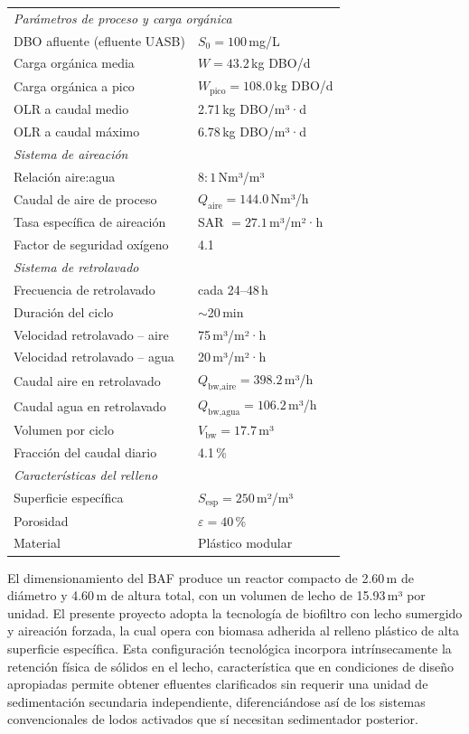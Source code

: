 \begin{longtable}{p{7cm}p{6cm}}
%
\multicolumn{2}{l}{\textit{Parámetros de proceso y carga orgánica}} \\[2pt]
DBO afluente (efluente UASB)  & $S_0 = 100$\,mg/L \\
Carga orgánica media          & $W = 43.2$\,kg DBO/d \\
Carga orgánica a pico         & $W_{\text{pico}} = 108.0$\,kg DBO/d \\
OLR a caudal medio            & 2.71\,kg DBO/m³·d \\
OLR a caudal máximo           & 6.78\,kg DBO/m³·d \\[4pt]
%
\multicolumn{2}{l}{\textit{Sistema de aireación}} \\[2pt]
Relación aire:agua            & $8:1$\,Nm³/m³ \\
Caudal de aire de proceso     & $Q_{\text{aire}} = 144.0$\,Nm³/h \\
Tasa específica de aireación  & SAR $= 27.1$\,m³/m²·h \\
Factor de seguridad oxígeno   & 4.1 \\[4pt]
%
\multicolumn{2}{l}{\textit{Sistema de retrolavado}} \\[2pt]
Frecuencia de retrolavado     & cada 24--48\,h \\
Duración del ciclo            & $\sim$20\,min \\
Velocidad retrolavado -- aire & 75\,m³/m²·h \\
Velocidad retrolavado -- agua & 20\,m³/m²·h \\
Caudal aire en retrolavado    & $Q_{\text{bw,aire}} = 398.2$\,m³/h \\
Caudal agua en retrolavado    & $Q_{\text{bw,agua}} = 106.2$\,m³/h \\
Volumen por ciclo             & $V_{\text{bw}} = 17.7$\,m³ \\
Fracción del caudal diario    & 4.1\,\% \\[4pt]
%
\multicolumn{2}{l}{\textit{Características del relleno}} \\[2pt]
Superficie específica         & $S_{\text{esp}} = 250$\,m²/m³ \\
Porosidad                     & $\varepsilon = 40$\,\% \\
Material                      & Plástico modular \\
\end{longtable}

El dimensionamiento del BAF produce un reactor compacto de 2.60\,m de diámetro y 4.60\,m de altura total, con un volumen de lecho de 15.93\,m³ por unidad. El presente proyecto adopta la tecnología de biofiltro con lecho sumergido y aireación forzada, la cual opera con biomasa adherida al relleno plástico de alta superficie específica. Esta configuración tecnológica incorpora intrínsecamente la retención física de sólidos en el lecho, característica que en condiciones de diseño apropiadas permite obtener efluentes clarificados sin requerir una unidad de sedimentación secundaria independiente, diferenciándose así de los sistemas convencionales de lodos activados que sí necesitan sedimentador posterior.

